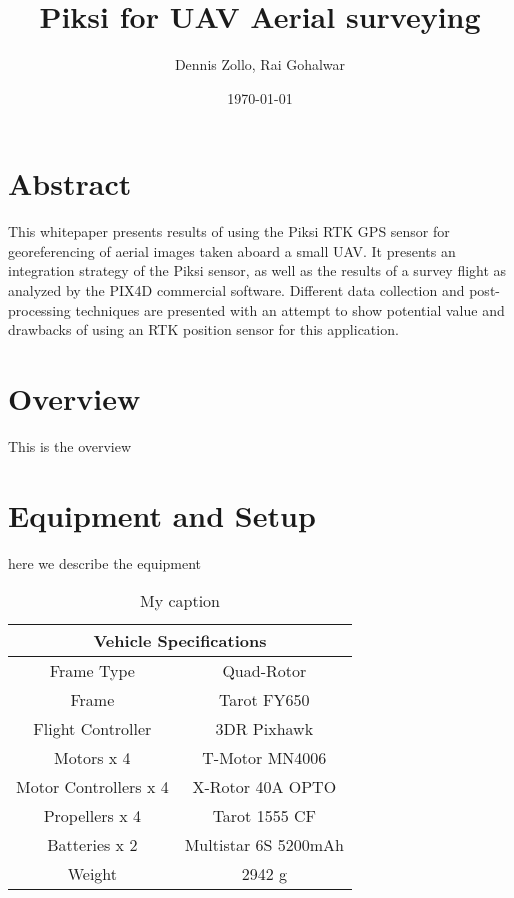 \documentclass{article}
\title{Piksi for UAV Aerial surveying}
\author{Dennis Zollo, Rai Gohalwar}
\date{\today}
\begin{document}
\maketitle

\thispagestyle{firstpage}

\section{Abstract}
\label{sec:abstract}
This whitepaper presents results of using the Piksi RTK GPS sensor for georeferencing of aerial images taken aboard a small UAV.  
It presents an integration strategy of the Piksi sensor, as well as the results of a survey flight as analyzed by the PIX4D commercial software. 
Different data collection and post-processing techniques are presented with an attempt to show potential value and drawbacks of using an RTK position sensor for this application.
\tableofcontents
\newpage
\section{Overview}
\label{sec:Overview}
This is the overview
\section{Equipment and Setup}
\label{sec:equipment}
here we describe the equipment
\begin{table}[]
\centering
\caption{My caption}
\label{my-label}
\begin{tabular}{|c|c|}
\hline
\multicolumn{2}{|c|}{Vehicle Specifications} \\ \hline
Frame Type            & Quad-Rotor           \\ \hline
Frame                 & Tarot FY650          \\ \hline
Flight Controller     & 3DR Pixhawk          \\ \hline
Motors x 4            & T-Motor MN4006       \\ \hline
Motor Controllers x 4 & X-Rotor 40A OPTO     \\ \hline
Propellers x 4        & Tarot 1555 CF        \\ \hline
Batteries x 2         & Multistar 6S 5200mAh \\ \hline
Weight                & 2942 g               \\ \hline
\end{tabular}
\end{table}
\thispagestyle{lastpage}
\end{document}
